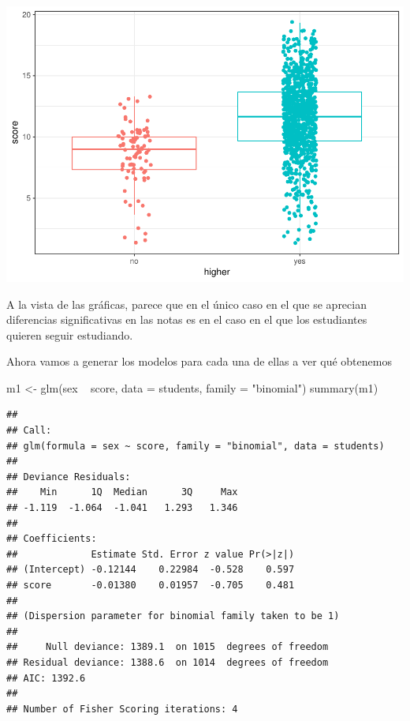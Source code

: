 \documentclass[]{article}
\newenvironment{Shaded}{\begin{snugshade}}{\end{snugshade}}
\newcommand{\DataTypeTok}[1]{\textcolor[rgb]{0.87,0.87,0.75}{#1}}
\newcommand{\KeywordTok}[1]{\textcolor[rgb]{0.94,0.87,0.69}{#1}}
\newcommand{\NormalTok}[1]{\textcolor[rgb]{0.80,0.80,0.80}{#1}}
\newcommand{\OperatorTok}[1]{\textcolor[rgb]{0.94,0.94,0.82}{#1}}
\newcommand{\StringTok}[1]{\textcolor[rgb]{0.80,0.58,0.58}{#1}}
\begin{document}
\includegraphics{Practica2_files/figure-latex/unnamed-chunk-53-4.pdf}

A la vista de las gráficas, parece que en el único caso en el que se
aprecian diferencias significativas en las notas es en el caso en el que
los estudiantes quieren seguir estudiando.

Ahora vamos a generar los modelos para cada una de ellas a ver qué
obtenemos

\begin{Shaded}
\begin{Highlighting}[]
\NormalTok{m1 <-}\StringTok{ }\KeywordTok{glm}\NormalTok{(sex }\OperatorTok{~}\StringTok{ }\NormalTok{score, }\DataTypeTok{data =}\NormalTok{ students, }\DataTypeTok{family =} \StringTok{"binomial"}\NormalTok{)}
\KeywordTok{summary}\NormalTok{(m1)}
\end{Highlighting}
\end{Shaded}

\begin{verbatim}
## 
## Call:
## glm(formula = sex ~ score, family = "binomial", data = students)
## 
## Deviance Residuals: 
##    Min      1Q  Median      3Q     Max  
## -1.119  -1.064  -1.041   1.293   1.346  
## 
## Coefficients:
##             Estimate Std. Error z value Pr(>|z|)
## (Intercept) -0.12144    0.22984  -0.528    0.597
## score       -0.01380    0.01957  -0.705    0.481
## 
## (Dispersion parameter for binomial family taken to be 1)
## 
##     Null deviance: 1389.1  on 1015  degrees of freedom
## Residual deviance: 1388.6  on 1014  degrees of freedom
## AIC: 1392.6
## 
## Number of Fisher Scoring iterations: 4
\end{verbatim}
\end{document}
